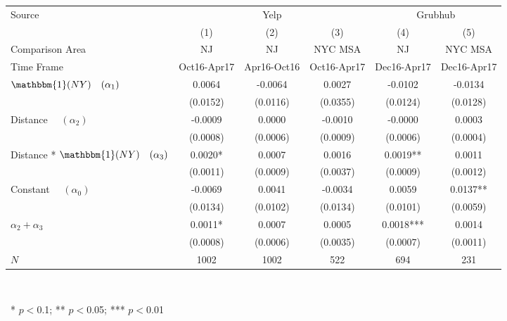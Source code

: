 \begin{center}
\begin{tabular}{lccccc}
\hline Source & \multicolumn{3}{c}{Yelp} & \multicolumn{2}{c}{Grubhub}\\
 & (1) & (2) & (3) & (4) & (5)\\
Comparison Area &   NJ    &   NJ    & NYC MSA &   NJ    & NYC MSA\\
Time Frame & Oct16-Apr17 & Apr16-Oct16 & Oct16-Apr17 & Dec16-Apr17 & Dec16-Apr17\\
\hline  $ \mathbbm{1}(NY) \quad (\alpha_1) $  & 0.0064 & -0.0064 & 0.0027 & -0.0102 & -0.0134\\
  & (0.0152) & (0.0116) & (0.0355) & (0.0124) & (0.0128)\\
 Distance $\quad (\alpha_2) $  & -0.0009 & 0.0000 & -0.0010 & -0.0000 & 0.0003\\
  & (0.0008) & (0.0006) & (0.0009) & (0.0006) & (0.0004)\\
 Distance * $ \mathbbm{1}(NY) \quad (\alpha_3) $  & 0.0020* & 0.0007 & 0.0016 & 0.0019** & 0.0011\\
  & (0.0011) & (0.0009) & (0.0037) & (0.0009) & (0.0012)\\
 Constant $\quad (\alpha_0) $  & -0.0069 & 0.0041 & -0.0034 & 0.0059 & 0.0137**\\
  & (0.0134) & (0.0102) & (0.0134) & (0.0101) & (0.0059)\\
\hline  $ \alpha_2 + \alpha_3 $  & 0.0011* & 0.0007 & 0.0005 & 0.0018*** & 0.0014\\
  & (0.0008) & (0.0006) & (0.0035) & (0.0007) & (0.0011)\\
\hline  $ N $  & 1002 & 1002 & 522 & 694 & 231\\
\hline\end{tabular}\\
\begin{tiny}\ * $p<0$.1; ** $p<0$.05; *** $p<0$.01\end{tiny}\\
\end{center}
